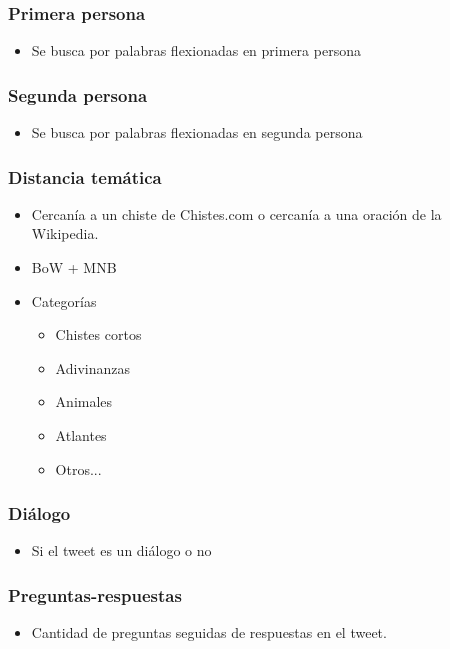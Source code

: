 \begin{frame}
    \frametitle{Primera persona}

    \begin{itemize}
        \item Se busca por palabras flexionadas en primera persona
    \end{itemize}
\end{frame}

\begin{frame}
    \frametitle{Segunda persona}

    \begin{itemize}
        \item Se busca por palabras flexionadas en segunda persona
    \end{itemize}
\end{frame}

\begin{frame}
    \frametitle{Distancia temática}

    \begin{itemize}
        \item Cercanía a un chiste de Chistes.com o cercanía a una oración de la Wikipedia.
        \item BoW + MNB
        \item Categorías
        \begin{itemize}
            \item Chistes cortos
            \item Adivinanzas
            \item Animales
            \item Atlantes
            \item Otros...
        \end{itemize}
    \end{itemize}
\end{frame}

\begin{frame}
    \frametitle{Diálogo}

    \begin{itemize}
        \item Si el tweet es un diálogo o no
    \end{itemize}
\end{frame}

\begin{frame}
    \frametitle{Preguntas-respuestas}

    \begin{itemize}
        \item Cantidad de preguntas seguidas de respuestas en el tweet.
    \end{itemize}
\end{frame}

